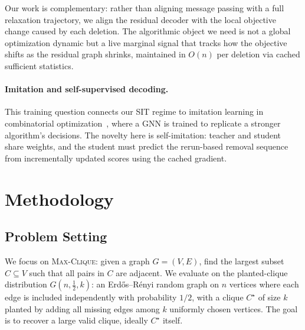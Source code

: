 \documentclass[11pt]{article}
\theoremstyle{plain}
\theoremstyle{remark}
\theoremstyle{plain}
\begin{document}
Our work is complementary: rather than aligning message passing with a full
relaxation trajectory, we align the residual decoder with the local objective change
caused by each deletion. The algorithmic object we need is not a global optimization
dynamic but a live marginal signal that tracks how the objective shifts as the
residual graph shrinks, maintained in $O(n)$ per deletion via cached sufficient
statistics.

\paragraph{Imitation and self-supervised decoding.}
This training question connects our SIT regime to imitation learning in combinatorial
optimization~\citep{liu2021}, where a GNN is trained to replicate a stronger
algorithm's decisions. The novelty here is self-imitation: teacher and student share
weights, and the student must predict the rerun-based removal sequence from
incrementally updated scores using the cached gradient.

\section{Methodology}
\label{sec:method}

\subsection{Problem Setting}
\label{sec:problem}

We focus on \textsc{Max-Clique}: given a graph $G=(V,E)$, find the largest subset
$C \subseteq V$ such that all pairs in $C$ are adjacent. We evaluate on the
planted-clique distribution $G(n,\tfrac{1}{2},k)$: an Erd\H{o}s--R\'enyi random
graph on $n$ vertices where each edge is included independently with probability
$1/2$, with a clique $C^\star$ of size $k$ planted by adding all missing edges among
$k$ uniformly chosen vertices. The goal is to recover a large valid clique, ideally
$C^\star$ itself.
\end{document}
